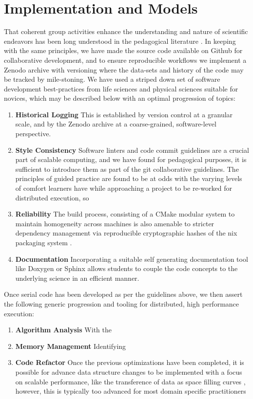 \documentclass[conference]{IEEEtran}
\begin{document}
\section{Implementation and Models}
That coherent group activities enhance the understanding and nature of scientific endeavors has been long understood in the pedagogical literature \cite{weirSmallChangesBig2019,bransfordHowPeopleLearn2000}. In keeping with the same principles, we have made the source code available on Github for collaborative development, and to ensure reproducible workflows we implement a Zenodo archive with versioning where the data-sets and history of the code may be tracked by mile-stoning. We have used a striped down set of software development best-practices from life sciences and physical sciences \cite{crouchSoftwareSustainabilityInstitute2013,altschulAnatomySuccessfulComputational2013,goswamiDSEAMSDeferredStructural2019,goswamiSpaceFillingCurves2019} suitable for novices, which may be described below with an optimal progression of topics:
\begin{enumerate}
	\item \textbf{Historical Logging} This is established by version control at a granular scale, and by the Zenodo archive at a coarse-grained, software-level perspective.
	\item \textbf{Style Consistency} Software linters and code commit guidelines are a crucial part of scalable computing, and we have found for pedagogical purposes, it is sufficient to introduce them as part of the git collaborative guidelines. The principles of guided practice are found to be at odds with the varying levels of comfort learners have while approaching a project to be re-worked for distributed execution, so
	\item \textbf{Reliability} The build process, consisting of a CMake modular system to maintain homogeneity across machines is also amenable to stricter dependency management via reproducible cryptographic hashes of the nix packaging system \cite{dolstraNixSafePolicyFree2004}.
	\item \textbf{Documentation} Incorporating a suitable self generating documentation tool like Doxygen or Sphinx allows students to couple the code concepts to the underlying science in an efficient manner.
\end{enumerate}
Once serial code has been developed as per the guidelines above, we then assert the following generic progression and tooling for distributed, high performance execution:
\begin{enumerate}
	\item \textbf{Algorithm Analysis} With the
	\item \textbf{Memory Management} Identifying
	\item \textbf{Code Refactor} Once the previous optimizations have been completed, it is possible for advance data structure changes to be implemented with a focus on scalable performance, like the transference of data as space filling curves \cite{goswamiSpaceFillingCurves2019}, however, this is typically too advanced for most domain specific practitioners
\end{enumerate}
\end{document}
